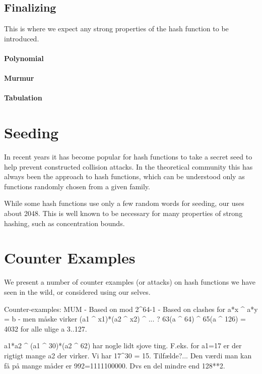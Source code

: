 \subsection{Finalizing}

This is where we expect any strong properties of the hash function to be introduced.

\paragraph{Polynomial}
\paragraph{Murmur}
\paragraph{Tabulation}



\section{Seeding}

In recent years it has become popular for hash functions to take a secret seed
to help prevent constructed collision attacks.
In the theoretical community this has always been the approach to hash functions,
which can be understood only as functions randomly chosen from a given family.

While some hash functions use only a few random words for seeding, our uses about 2048.
This is well known to be necessary for many properties of strong hashing, such as concentration bounds.

   

\section{Counter Examples}

We present a number of counter examples (or attacks) on hash functions we have seen in the wild, or considered using our selves.

Counter-examples:
MUM
   - Based on mod 2^64-1
   - Based on clashes for a*x ^ a*y = b
   - men måske virker (a1 ^ x1)*(a2 ^ x2) ^ ... ?
   63(a ^ 64) ^ 65(a ^ 126) = 4032
   for alle ulige a 3..127.


   a1*a2 ^ (a1 ^ 30)*(a2 ^ 62)
   har nogle lidt sjove ting. F.eks. for a1=17 er der rigtigt mange a2 der virker.
   Vi har 17^30 = 15. Tilfælde?...
   Den værdi man kan få på mange måder er 992=1111100000. Dvs en del mindre end 128**2.

